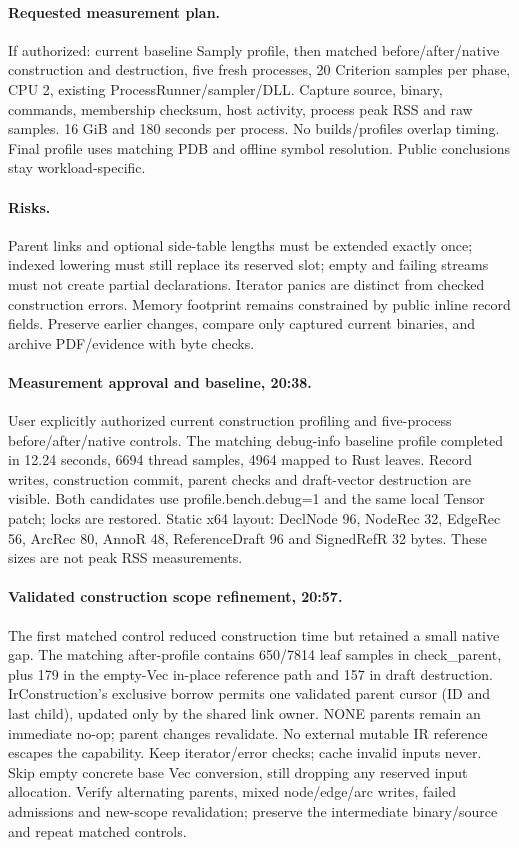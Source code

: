 \documentclass[11pt,a4paper]{article}
\begin{document}
\paragraph{Requested measurement plan.} If authorized: current baseline Samply profile,
then matched before/after/native construction and destruction, five fresh processes,
20 Criterion samples per phase, CPU 2, existing ProcessRunner/sampler/DLL. Capture source,
binary, commands, membership checksum, host activity, process peak RSS and raw samples.
16 GiB and 180 seconds per process. No builds/profiles overlap timing. Final profile uses
matching PDB and offline symbol resolution. Public conclusions stay workload-specific.
\paragraph{Risks.} Parent links and optional side-table lengths must be extended exactly once;
indexed lowering must still replace its reserved slot; empty and failing streams must not
create partial declarations. Iterator panics are distinct from checked construction errors.
Memory footprint remains constrained by public inline record fields. Preserve earlier
changes, compare only captured current binaries, and archive PDF/evidence with byte checks.
\paragraph{Measurement approval and baseline, 20:38.} User explicitly authorized current
construction profiling and five-process before/after/native controls. The matching debug-info
baseline profile completed in 12.24 seconds, 6694 thread samples, 4964 mapped to Rust leaves.
Record writes, construction commit, parent checks and draft-vector destruction are visible.
Both candidates use profile.bench.debug=1 and the same local Tensor patch; locks are restored.
Static x64 layout: DeclNode 96, NodeRec 32, EdgeRec 56, ArcRec 80, AnnoR 48,
ReferenceDraft 96 and SignedRefR 32 bytes. These sizes are not peak RSS measurements.
\paragraph{Validated construction scope refinement, 20:57.} The first matched control
reduced construction time but retained a small native gap. The matching after-profile
contains 650/7814 leaf samples in check\_parent, plus 179 in the empty-Vec in-place
reference path and 157 in draft destruction. IrConstruction's exclusive borrow permits
one validated parent cursor (ID and last child), updated only by the shared link owner.
NONE parents remain an immediate no-op; parent changes revalidate. No external mutable
IR reference escapes the capability. Keep iterator/error checks; cache invalid inputs never.
Skip empty concrete base Vec conversion, still dropping any reserved input allocation.
Verify alternating parents, mixed node/edge/arc writes, failed admissions and new-scope
revalidation; preserve the intermediate binary/source and repeat matched controls.
\end{document}
